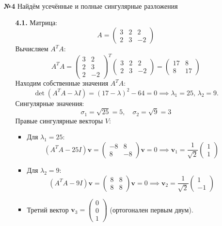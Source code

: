 \documentclass[a4paper]{article}
\begin{document}
\begin{enumerate}
  \item[\textbf{№4}]Найдём усечённые и полные сингулярные разложения
  \begin{enumerate}
  \item[\textbf{4.1.}] Матрица:  
  \[
  A = \begin{pmatrix}
  3 & 2 & 2 \\
  2 & 3 & -2
  \end{pmatrix}
  \]
  Вычисляем \( A^T A \):  
  \[
  A^T A = \begin{pmatrix}
  3 & 2 \\
  2 & 3 \\
  2 & -2
  \end{pmatrix}^T \begin{pmatrix}
  3 & 2 & 2 \\
  2 & 3 & -2
  \end{pmatrix} = \begin{pmatrix}
  17 & 8 \\
  8 & 17
  \end{pmatrix}
  \]
  Находим собственные значения \( A^T A \):  
  \[
  \det(A^T A - \lambda I) = (17 - \lambda)^2 - 64 = 0 \implies \lambda_1 = 25, \, \lambda_2 = 9.
  \]  
  Сингулярные значения:  
  \[
  \sigma_1 = \sqrt{25} = 5, \quad \sigma_2 = \sqrt{9} = 3
  \]
  Правые сингулярные векторы \( V \):  
  \begin{itemize}
    \item 
    Для \( \lambda_1 = 25 \):  
    \[
    (A^T A - 25I)\mathbf{v} = \begin{pmatrix}
    -8 & 8 \\
    8 & -8
    \end{pmatrix}\mathbf{v} = 0 \implies \mathbf{v}_1 = \frac{1}{\sqrt{2}} 
    \begin{pmatrix} 1 \\ 1 \end{pmatrix}
    \]  
    \item 
    Для \( \lambda_2 = 9 \):  
    \[
    (A^T A - 9I)\mathbf{v} = \begin{pmatrix}
    8 & 8 \\
    8 & 8
    \end{pmatrix}\mathbf{v} = 0 \implies \mathbf{v}_2 = 
    \frac{1}{\sqrt{2}} \begin{pmatrix} 1 \\ -1 \end{pmatrix}
    \]  
    \item
    Третий вектор \( \mathbf{v}_3 = 
    \begin{pmatrix} 0 \\ 0 \\ 1 \end{pmatrix} \) (ортогонален первым двум).  

\end{itemize}
\end{enumerate}
\end{enumerate}
\end{document}
